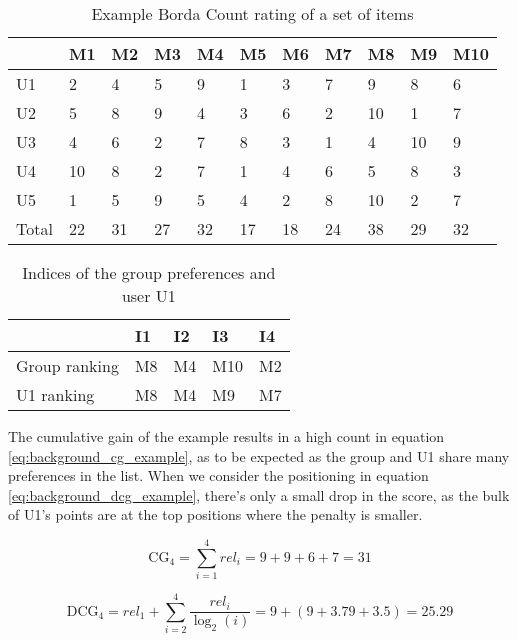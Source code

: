 \begin{table}[H]
	\centering
	\begin{tabular}{l|l|l|l|l|l|l|l|l|l|l|}
		\cline{2-11}
		& M1 & M2 & M3 & M4 & M5 & M6 & M7 & M8 & M9 & M10 \\ \hline
		\multicolumn{1}{|l|}{U1} & 2 & 4 & 5 & 9 & 1 & 3 & 7 & 9 & 8 & 6 \\ \hline
		\multicolumn{1}{|l|}{U2} & 5 & 8 & 9 & 4 & 3 & 6 & 2 & 10 & 1 & 7 \\ \hline
		\multicolumn{1}{|l|}{U3} & 4 & 6 & 2 & 7 & 8 & 3 & 1 & 4 & 10 & 9 \\ \hline
		\multicolumn{1}{|l|}{U4} & 10 & 8 & 2 & 7 & 1 & 4 & 6 & 5 & 8 & 3 \\ \hline
		\multicolumn{1}{|l|}{U5} & 1 & 5 & 9 & 5 & 4 & 2 & 8 & 10 & 2 & 7 \\ \hline
		\multicolumn{1}{|l|}{Total} & 22 & 31 & 27 & 32 & 17 & 18 & 24 & 38 & 29 & 32 \\ \hline
	\end{tabular}
	\caption{Example Borda Count rating of a set of items}
	\label{tbl:testandeval_bordacount}
\end{table}

\begin{table}[H]
	\centering
	\begin{tabular}{l|l|l|l|l|}
		\cline{2-5}
		& I1 & I2 & I3 & I4\\ \hline
		\multicolumn{1}{|l|}{Group ranking} & M8 & M4 & M10 & M2\\ \hline
		\multicolumn{1}{|l|}{U1 ranking} & M8 & M4 & M9 & M7\\ \hline
	\end{tabular}
	\caption{Indices of the group preferences and user U1}
	\label{tbl:testandeval_positions}
\end{table}

The cumulative gain of the example results in a high count in equation \ref{eq:background_cg_example}, as to be expected as the group and U1 share many preferences in the list. When we consider the positioning in equation \ref{eq:background_dcg_example}, there's only a small drop in the score, as the bulk of U1's points are at the top positions where the penalty is smaller.

\begin{equation}\label{eq:background_cg_example}
\text{CG}_4 = \sum_{i=1}^{4}\textit{rel}_i = 9 + 9 + 6 + 7 = 31
\end{equation}

\begin{equation}\label{eq:background_dcg_example}
\text{DCG}_4 = \textit{rel}_1 + \sum_{i=2}^{4}\frac{\textit{rel}_i}{\log_2(i)}
= 9 + (9 + 3.79 + 3.5) = 25.29
\end{equation}

